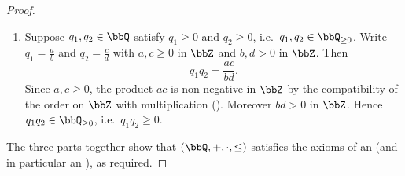 \begin{proof}
\begin{enumerate}
        \item Suppose $q_1, q_2 \in \bbQ$ satisfy $q_1 \ge 0$ and $q_2 \ge 0$, i.e.\ $q_1, q_2 \in \bbQ_{\ge 0}$. Write $q_1 = \frac{a}{b}$ and $q_2 = \frac{c}{d}$ with $a, c \ge 0$ in $\bbZ$ and $b, d > 0$ in $\bbZ$. Then
        $$q_1 q_2 = \frac{ac}{bd}.$$
        Since $a, c \ge 0$, the product $ac$ is non-negative in $\bbZ$ by the compatibility of the order on $\bbZ$ with multiplication (). Moreover $bd > 0$ in $\bbZ$. Hence $q_1 q_2 \in \bbQ_{\ge 0}$, i.e.\ $q_1 q_2 \ge 0$.
    \end{enumerate}

    The three parts together show that $(\bbQ, +, \cdot, \le)$ satisfies the axioms of an  (and in particular an ), as required.
\end{proof}